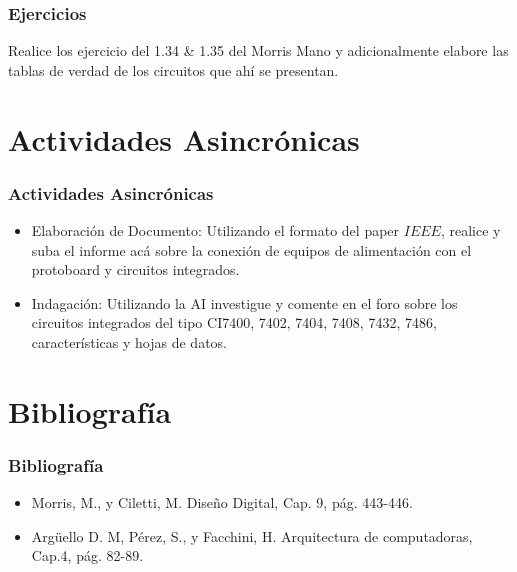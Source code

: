 \documentclass[11pt]{beamer}
\begin{document}
\begin{frame}
\frametitle{Ejercicios}
Realice los ejercicio del 1.34 \& 1.35 del Morris Mano y adicionalmente elabore las tablas de verdad de los circuitos que ah\'i se presentan.
\end{frame}

\section{Actividades Asincr\'onicas}
\begin{frame}
\frametitle{Actividades Asincr\'onicas}
	\begin{itemize}
		\item Elaboraci\'on de Documento: Utilizando el formato del paper $IEEE$, realice y suba el informe acá sobre la conexión de equipos de alimentación con el protoboard y circuitos integrados.
		\item Indagaci\'on: Utilizando la AI investigue y comente en el foro sobre los circuitos integrados del tipo CI7400, 7402, 7404, 7408, 7432, 7486, características y hojas de datos.
		\end{itemize}
\end{frame}

\section{Bibliograf\'ia}
\begin{frame}
	\frametitle{Bibliograf\'ia}
	\begin{itemize}
		\item Morris, M., y Ciletti, M. Diseño Digital, Cap. 9, pág. 443-446.
		\item Argüello D. M, Pérez, S., y Facchini, H. Arquitectura de computadoras, Cap.4, pág. 82-89.
		\end{itemize}
\end{frame}
\end{document}
